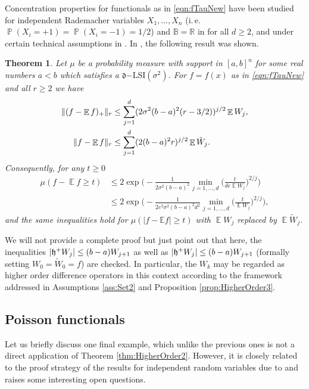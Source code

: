 \documentclass[a4paper,12pt]{amsart}
\numberwithin{equation}{section}
\newtheorem{satz}{Theorem}[section]
\theoremstyle{remark}
\DeclarePairedDelimiter	{\abs}		{\lvert}	{\rvert}
\DeclarePairedDelimiter	{\norm}		{\lVert}	{\rVert}
\DeclareMathOperator	{\IE}		{\mathbb{E}}
\DeclareMathOperator	{\IP}		{\mathbb{P}}
\newcommand				{\dpartial}	{\mathfrak{d}}
\def\E{{\mathbb E}}
\begin{document}
Concentration properties for functionals as in \eqref{eqn:fTauNew} have been studied for independent Rademacher variables $X_1, \ldots, X_n$ (i.\,e. $\IP(X_i = +1) = \IP(X_i = -1) = 1/2$) and $\mathbb{B} = \mathbb{R}$ in \cite[Th.\ 14]{BBLM05} for all $d \ge 2$, and under certain technical assumptions in \cite{Ada15}. In \cite{GSS21a}, the following result was shown.

\begin{satz}			\label{theorem:ChaosInIndependentOrPartialLSI}
	Let $\mu$ be a probability measure with support in $[a,b]^n$ for some real numbers $a < b$ which satisfies a $\dpartial\mathrm{-LSI}(\sigma^2)$. For $f = f(x)$ as in \eqref{eqn:fTauNew} and all $r \ge 2$ we have
	\begin{align*}
		\norm{(f - \IE f)_+}_r &\le \sum_{j = 1}^d (2\sigma^2 (b-a)^2 (r-3/2))^{j/2} \IE W_j, \\
		\norm{f - \IE f}_r &\le \sum_{j = 1}^d (2(b-a)^2 r)^{j/2} \IE\tilde{W}_j.
	\end{align*}
	Consequently, for any $t \ge 0$
	\begin{align*}		\label{eqn:ConcentrationEstimateNumber1}
			\mu \left( f - \IE f \ge t \right) &\le 2 \exp \Big( - \frac{1}{2\sigma^2(b-a)^2} \min_{j=1,\ldots,d} \Big( \frac{t}{de \IE W_j} \Big)^{2/j} \Big) \\
			&\le 2 \exp \Big( -\frac{1}{2e^2\sigma^2(b-a)^2d^2} \min_{j=1,\ldots,d} \Big( \frac{t}{\IE W_j} \Big)^{2/j}  \Big),
	\end{align*}
	and the same inequalities hold for $\mu(|f-\E f| \ge t)$ with $\IE W_j$ replaced by $\IE \tilde{W}_j$.
\end{satz}

We will not provide a complete proof but just point out that here, the inequalities $\abs{\mathfrak{h}^+ W_j} \le (b-a)W_{j+1}$ as well as $\abs{\mathfrak{h}^+ W_j} \le (b-a)W_{j+1}$ (formally setting $W_0 = \tilde{W}_0 = f$) are checked. In particular, the $W_k$ may be regarded as higher order difference operators in this context according to the framework addressed in Assumptions \ref{ass:Set2} and Proposition \ref{prop:HigherOrder3}.

\subsection{Poisson functionals}

Let us briefly discuss one final example, which unlike the previous ones is not a direct application of Theorem \ref{thm:HigherOrder2}. However, it is closely related to the proof strategy of the results for independent random variables due to \cite{BBLM05} and raises some interesting open questions.
\end{document}
